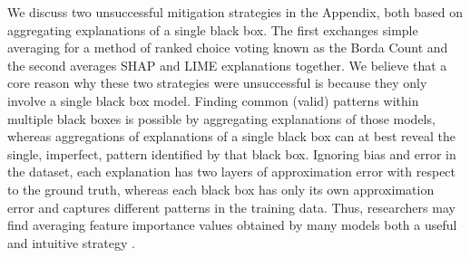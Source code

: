 \documentclass[mnsc,blindrev]{informs3}
\begin{document}
            We discuss two unsuccessful mitigation strategies in the Appendix, both based on aggregating explanations of a single black box. The first exchanges simple averaging for a method of ranked choice voting known as the Borda Count and the second averages SHAP and LIME explanations together. We believe that a core reason why these two strategies were unsuccessful is because they only involve a single black box model. Finding common (valid) patterns within multiple black boxes is possible by aggregating explanations of those models, whereas aggregations of explanations of a single black box can at best reveal the single, imperfect, pattern identified by that black box. Ignoring bias and error in the dataset, each explanation has two layers of approximation error with respect to the ground truth, whereas each black box has only its own approximation error and captures different patterns in the training data. Thus, researchers may find averaging feature importance values obtained by many models both a useful and intuitive strategy \citep{dong2020variable,donnelly2023rashomon}.  %
            
\end{document}
